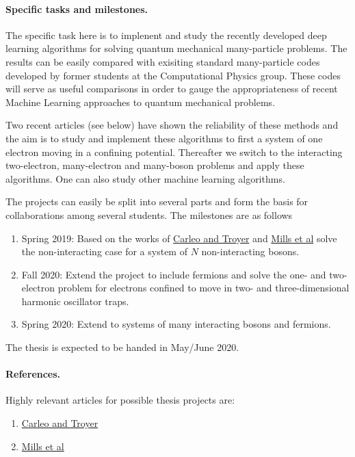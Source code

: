 \documentclass[%
oneside,                 %
final,                   %
10pt]{article}
\begin{document}
\paragraph{Specific tasks and milestones.}
The specific task here is to implenent and study the recently developed
deep learning algorithms for solving quantum mechanical many-particle
problems. The results can  be easily compared with exisiting standard
many-particle codes developed by former students at the Computational
Physics group. These codes will serve as useful comparisons in order
to gauge the appropriateness of recent Machine Learning approaches to
quantum mechanical problems.

Two recent articles (see below) have shown the reliability of these methods and
the aim is to study and implement these algorithms to first a system
of one electron moving in a confining potential. Thereafter we switch
to the interacting two-electron, many-electron and many-boson problems and apply
these algorithms.  One can also study other machine learning algorithms. 


The projects can easily be split into several parts and form the basis for collaborations among several students. The milestones are as follows
\begin{enumerate}
\item Spring 2019: Based on the works of \href{{http://science.sciencemag.org/content/355/6325/602}}{Carleo and Troyer} and \href{{https://journals.aps.org/pra/abstract/10.1103/PhysRevA.96.042113}}{Mills et al} solve the non-interacting case for a system of $N$ non-interacting bosons.

\item Fall 2020: Extend the project to include fermions and solve the one- and two-electron problem for electrons confined to move in two- and three-dimensional harmonic oscillator traps. 

\item Spring 2020: Extend to systems of many interacting bosons and fermions.
\end{enumerate}

\noindent
The thesis is expected to be handed in May/June  2020.

\paragraph{References.}
Highly relevant articles for possible thesis projects are:

\begin{enumerate}
\item \href{{http://science.sciencemag.org/content/355/6325/602}}{Carleo and Troyer} 

\item \href{{https://journals.aps.org/pra/abstract/10.1103/PhysRevA.96.042113}}{Mills et al} 
\end{enumerate}

\noindent


\end{document}

